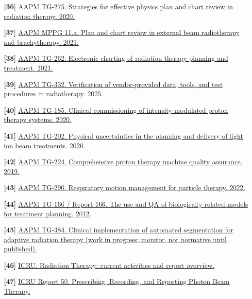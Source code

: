 \documentclass[11pt,letterpaper]{article}
\begin{document}
\textbf{[36] }\href{\detokenize{https://www.aapm.org/pubs/reports/detail.asp?docid=198}}{AAPM TG-275. Strategies for effective physics plan and chart review in radiation therapy. 2020.}

\textbf{[37] }\href{\detokenize{https://aapm.org/pubs/MPPG/detail.asp?docid=263}}{AAPM MPPG 11.a. Plan and chart review in external beam radiotherapy and brachytherapy. 2021.}

\textbf{[38] }\href{\detokenize{https://www.aapm.org/pubs/reports/detail.asp?docid=220}}{AAPM TG-262. Electronic charting of radiation therapy planning and treatment. 2021.}

\textbf{[39] }\href{\detokenize{https://www.aapm.org/pubs/reports/detail.asp?docid=298}}{AAPM TG-332. Verification of vendor-provided data, tools, and test procedures in radiotherapy. 2025.}

\textbf{[40] }\href{\detokenize{https://www.aapm.org/pubs/reports/detail.asp?docid=208}}{AAPM TG-185. Clinical commissioning of intensity-modulated proton therapy systems. 2020.}

\textbf{[41] }\href{\detokenize{https://www.aapm.org/pubs/reports/RPT_202.pdf}}{AAPM TG-202. Physical uncertainties in the planning and delivery of light ion beam treatments. 2020.}

\textbf{[42] }\href{\detokenize{https://www.aapm.org/pubs/reports/detail.asp?docid=187}}{AAPM TG-224. Comprehensive proton therapy machine quality assurance. 2019.}

\textbf{[43] }\href{\detokenize{https://www.aapm.org/pubs/reports/detail.asp?docid=223}}{AAPM TG-290. Respiratory motion management for particle therapy. 2022.}

\textbf{[44] }\href{\detokenize{https://www.aapm.org/pubs/reports/detail.asp?docid=134}}{AAPM TG-166 \slash\allowbreak{} Report 166. The use and QA of biologically related models for treatment planning. 2012.}

\textbf{[45] }\href{\detokenize{https://www.aapm.org/org/structure/?committee_code=TG384}}{AAPM TG-384. Clinical implementation of automated segmentation for adaptive radiation therapy (work in progress; monitor, not normative until published).}

\textbf{[46] }\href{\detokenize{https://www.icru.org/current-activities-of-icru/radiation-therapy/}}{ICRU. Radiation Therapy: current activities and report overview.}

\textbf{[47] }\href{\detokenize{https://www.icru.org/report/prescribing-recording-and-reporting-photon-beam-therapy-report-50/}}{ICRU Report 50. Prescribing, Recording, and Reporting Photon Beam Therapy.}
\end{document}
